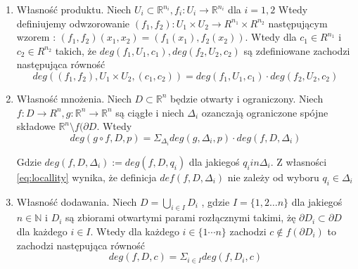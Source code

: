 \begin{enumerate}
    \item Własność produktu. \newline
     Niech $ U_i \subset \mathbb R^{n_i}, f_i : U_i  \to \mathbb R^{n_i} $ dla $ i =1,2 $
     Wtedy definiujemy odwzorowanie $ (f_1,f_2) : U_1 \times U_2 \to R^{n_1} \times R^{n_2} $ następującym wzorem :
     $ (f_1,f_2)(x_1,x_2) = (f_1(x_1),f_2(x_2)) $. Wtedy dla $c_1 \in R^{n_1}  $ i $ c_2 \in R^{n_2} $ takich, że $ deg(f_1,U_1,c_1),deg(f_2,U_2,c_2) $ są zdefiniowane 
     zachodzi następująca równość 
     \begin{equation}
	deg((f_1,f_2), U_1 \times U_2 , (c_1,c_2)) = deg(f_1,U_1,c_1) \cdot deg(f_2,U_2,c_2)
     \end{equation}
     
     \item Własność mnożenia. \newline
     Niech $ D \subset \mathbb R^n $ będzie otwarty i ograniczony. Niech $ f : D \to R^n , g : \mathbb R^n \to \mathbb R^n $ są ciągłe i niech $ \Delta_i $ ozanczają 
     ograniczone spójne składowe $ \mathbb R^n \setminus f(\partial{D}$. Wtedy 
     \begin{equation}
	  deg (g \circ f ,D,p) = \Sigma_{\Delta_i} deg(g,\Delta_i,p) \cdot deg(f,D,\Delta_i) 
     \end{equation}
     
     Gdzie $ deg(f,D,\Delta_i) := deg(f,D,q_i)$ dla jakiegoś $ q_i in \Delta_i $. Z własności \ref{eq:locallity} wynika, że definicja $ def(f,D,\Delta_i ) $ nie zależy od wyboru
     $ q_i \in \Delta_i $
     
     \item Własność dodawania. \newline
     Niech $ D = \bigcup_{i \in I} D_i $ , gdzie $ I = \{1,2 \dots n \} $ dla jakiegoś $ n \in \mathbb N $ i $ D_i $ są zbiorami otwartymi parami rozłącznymi takimi, żę 
     $ \partial{D_i} \subset \partial{D} $ dla każdego $ i \in I $. Wtedy dla każdego $ i \in \{1 \cdots n\}$ zachodzi $ c \notin f(\partial{D_i})  $ to zachodzi 
     następująca równość
     \begin{equation}
	deg(f,D,c) = \Sigma_{i \in I} deg(f,D_i,c)
     \end{equation}
\end{enumerate}

